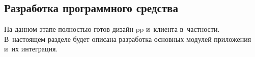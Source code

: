 \subsection{Разработка программного средства}
\label{sec:development:client}

На данном этапе полностью готов дизайн \gls{pp} и~клиента в~частности. В~настоящем разделе будет описана разработка основных модулей приложения и~их интеграция.




